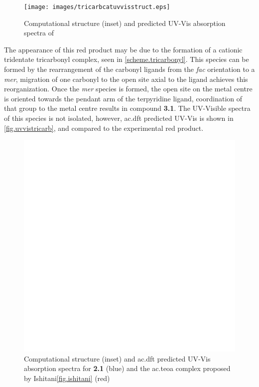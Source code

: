 \begin{figure}[!htbp]
 \begin{center}
  \texttt{[image: images/tricarbcatuvvisstruct.eps]}
 \end{center}
 \caption[Structure and absorption spectra of proposed ]{Computational structure (inset) and predicted UV-Vis absorption spectra of }
 \label{fig.uvvistricarb}
\end{figure}

The appearance of this red product may  be due to the formation of a cationic tridentate tricarbonyl complex, seen in \autoref{scheme.tricarbonyl}. This species can be formed by the rearrangement of the carbonyl ligands from the \textit{fac} orientation to a \textit{mer}, migration of one carbonyl to the open site axial to the ligand achieves this reorganization. Once the \textit{mer} species is formed, the open site on the metal centre is oriented towards the pendant arm of the terpyridine ligand, coordination of that group to the metal centre results in compound \textbf{3.1}. The UV-Visible spectra of this species is not isolated, however, \gls{ac.dft} predicted UV-Vis is shown in \autoref{fig.uvvistricarb}, and compared to the experimental red product. 

\begin{figure}[!htbp]
 \begin{center}
  \includegraphics[clip=true, keepaspectratio, width=120mm]{images/ishitani.eps}
 \end{center}
\caption[UV-Vis spectra for \textbf{2.1} and catalyst-TEOA complex]{Computational structure (inset) and \gls{ac.dft} predicted UV-Vis absorption spectra for \textbf{2.1} (blue) and the \gls{ac.teoa} complex proposed by Ishitani\autoref{fig.ishitani} (red)}
\label{fig.ishitani}
\end{figure}

